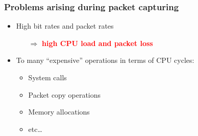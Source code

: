 \begin{frame}
\frametitle{Problems arising during packet capturing}
\begin{itemize}
	\item High bit rates and packet rates
		\begin{itemize}
			\item [$\Rightarrow$] \textbf{\textcolor{red}{high CPU load and packet loss}}
		\end{itemize}
\end{itemize}

	\begin{itemize}
	\item To many ``expensive'' operations in terms of CPU cycles: 
		\begin{itemize}
			\item System calls
			\item Packet copy operations
			\item Memory allocations
			\item etc\ldots\newline
		\end{itemize}
	\end{itemize}

\end{frame}

 {}
